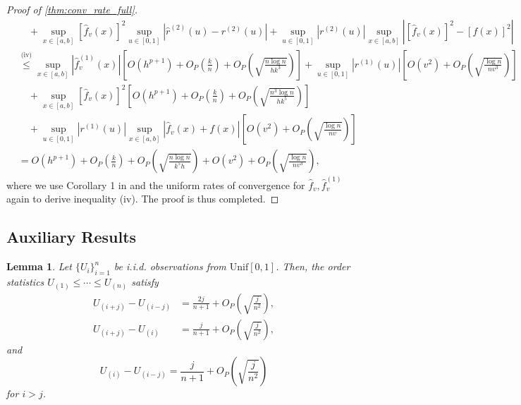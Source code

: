 \documentclass{uwstat572}
\newtheorem{lemma}[theorem]{Lemma}
\theoremstyle{definition}
\renewcommand{\hat}{\widehat}
\theoremstyle{theorem}
\begin{document}
\begin{proof}[Proof of \autoref{thm:conv_rate_full}]
\begin{align*}
&\quad + \sup_{x\in [a,b]}\left[\hat{f}_v(x)\right]^2 \sup_{u\in [0,1]}\left|\hat{r}^{(2)}(u) - r^{(2)}(u) \right| + \sup_{u\in [0,1]}\left|r^{(2)}(u)\right| \sup_{x\in [a,b]}\left|\left[\hat{f}_v(x)\right]^2 -\left[f(x)\right]^2\right| \\
&\stackrel{\text{(iv)}}{\leq} \sup_{x\in [a,b]} \left|\hat{f}_v^{(1)}(x)\right| \left[O(h^{p+1}) + O_P\left(\frac{k}{n}\right) +O_P\left(\sqrt{\frac{n\log n}{hk^3}}\right)\right] + \sup_{u\in [0,1]}\left|r^{(1)}(u)\right| \left[O(v^2) + O_P\left(\sqrt{\frac{\log n}{nv^3}}\right)\right]\\
&\quad + \sup_{x\in [a,b]}\left[\hat{f}_v(x)\right]^2 \left[O(h^{p+1}) + O_P\left(\frac{k}{n}\right) +O_P\left(\sqrt{\frac{n^3\log n}{hk^5}}\right)\right] \\
&\quad + \sup_{u\in [0,1]}\left|r^{(1)}(u)\right| \sup_{x\in [a,b]}\left|\hat{f}_v(x) + f(x) \right| \left[O(v^2) + O_P\left(\sqrt{\frac{\log n}{nv}}\right)\right]\\
&= O(h^{p+1}) + O_P\left(\frac{k}{n}\right) +O_P\left(\sqrt{\frac{n\log n}{k^5h}}\right) + O(v^2) + O_P\left(\sqrt{\frac{\log n}{nv^3}}\right),
\end{align*}
where we use Corollary 1 in \cite{francisco2003uniform} and the uniform rates of convergence for $\hat{f}_v, \hat{f}_v^{(1)}$ again to derive inequality (iv). The proof is thus completed.
\end{proof}

\subsection{Auxiliary Results}
\label{App:auxi_res}

\begin{lemma}
\label{lem:unif_asym}
Let $\{U_i\}_{i=1}^n$ be i.i.d. observations from $\mathrm{Unif}[0,1]$. Then, the order statistics $U_{(1)} \leq \cdots \leq U_{(n)}$ satisfy
\begin{align*}
U_{(i+j)} - U_{(i-j)} &= \frac{2j}{n+1} +O_P\left(\sqrt{\frac{j}{n^2}} \right),\\
U_{(i+j)} - U_{(i)} &= \frac{j}{n+1} +O_P\left(\sqrt{\frac{j}{n^2}} \right),
\end{align*}
and
$$U_{(i)} - U_{(i-j)} = \frac{j}{n+1} +O_P\left(\sqrt{\frac{j}{n^2}} \right)$$
for $i>j$.
\end{lemma}
\end{document}
